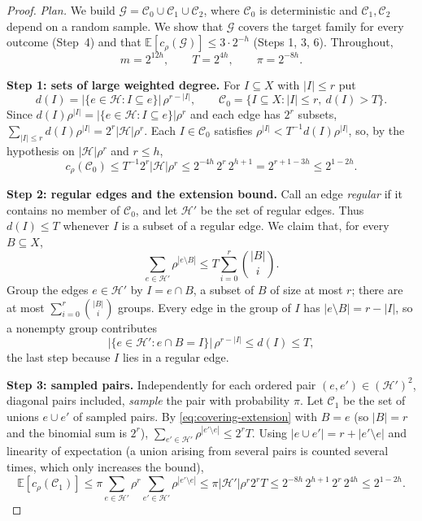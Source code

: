 \documentclass[11pt,letterpaper]{article}
\theoremstyle{definition}
\theoremstyle{remark}
\numberwithin{equation}{section}
\newcommand{\step}[1]{\par\smallskip\noindent\textbf{#1}\enspace}
\begin{document}
\begin{proof}
\emph{Plan.} We build
$\mathcal G=\mathcal C_0\cup\mathcal C_1\cup\mathcal C_2$, where
$\mathcal C_0$ is deterministic and $\mathcal C_1,\mathcal C_2$ depend on
a random sample. We show that $\mathcal G$ covers the target family for
every outcome (Step~4) and that
$\mathbb E[c_\rho(\mathcal G)]\le3\cdot2^{-h}$ (Steps 1, 3, 6).
Throughout,
\[
m=2^{12h},\qquad T=2^{4h},\qquad \pi=2^{-8h}.
\]

\step{Step 1: sets of large weighted degree.}
For $I\subseteq X$ with $|I|\le r$ put
\[
d(I)=|\{e\in\mathcal H:I\subseteq e\}|\,\rho^{r-|I|},
\qquad
\mathcal C_0=\{I\subseteq X:|I|\le r,\ d(I)>T\}.
\]
Since $d(I)\rho^{|I|}=|\{e\in\mathcal H:I\subseteq e\}|\rho^r$ and each
edge has $2^r$ subsets,
$\sum_{|I|\le r}d(I)\rho^{|I|}=2^r|\mathcal H|\rho^r$. Each
$I\in\mathcal C_0$ satisfies $\rho^{|I|}<T^{-1}d(I)\rho^{|I|}$, so, by
the hypothesis on $|\mathcal H|\rho^r$ and $r\le h$,
\begin{equation}\label{eq:covering-initial-cost}
c_\rho(\mathcal C_0)
\le T^{-1}2^r|\mathcal H|\rho^r
\le2^{-4h}\,2^r\,2^{h+1}=2^{r+1-3h}\le2^{1-2h}.
\end{equation}

\step{Step 2: regular edges and the extension bound.}
Call an edge \emph{regular} if it contains no member of $\mathcal C_0$,
and let $\mathcal H'$ be the set of regular edges. Thus $d(I)\le T$
whenever $I$ is a subset of a regular edge. We claim that, for every
$B\subseteq X$,
\begin{equation}\label{eq:covering-extension}
\sum_{e\in\mathcal H'}\rho^{|e\setminus B|}
\le T\sum_{i=0}^r\binom{|B|}{i}.
\end{equation}
Group the edges $e\in\mathcal H'$ by $I=e\cap B$, a subset of $B$ of
size at most $r$; there are at most $\sum_{i=0}^r\binom{|B|}{i}$ groups.
Every edge in the group of $I$ has $|e\setminus B|=r-|I|$, so a nonempty
group contributes
\[
|\{e\in\mathcal H':e\cap B=I\}|\,\rho^{r-|I|}\le d(I)\le T,
\]
the last step because $I$ lies in a regular edge.

\step{Step 3: sampled pairs.}
Independently for each ordered pair $(e,e')\in(\mathcal H')^2$, diagonal
pairs included, \emph{sample} the pair with probability $\pi$. Let
$\mathcal C_1$ be the set of unions $e\cup e'$ of sampled pairs.
By \eqref{eq:covering-extension} with $B=e$ (so $|B|=r$ and the binomial
sum is $2^r$), $\sum_{e'\in\mathcal H'}\rho^{|e'\setminus e|}\le2^rT$.
Using $|e\cup e'|=r+|e'\setminus e|$ and linearity of expectation (a
union arising from several pairs is counted several times, which only
increases the bound),
\begin{equation}\label{eq:covering-pair-cost}
\mathbb E[c_\rho(\mathcal C_1)]
\le\pi\sum_{e\in\mathcal H'}\rho^r\sum_{e'\in\mathcal H'}\rho^{|e'\setminus e|}
\le\pi|\mathcal H'|\rho^r2^rT
\le2^{-8h}\,2^{h+1}\,2^r\,2^{4h}\le2^{1-2h}.
\end{equation}


\end{proof}
\end{document}
